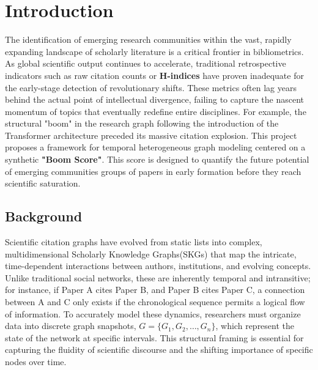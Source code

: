 \documentclass[a4paper,12pt]{article}
\begin{document}
\newpage

\setcounter{page}{1}

\section{Introduction}
The identification of emerging research communities within the vast, rapidly expanding 
landscape of scholarly literature is a critical frontier in bibliometrics. As global 
scientific output continues to accelerate, traditional retrospective indicators such 
as raw citation counts or \textbf{H-indices} have proven inadequate for the early-stage 
detection of revolutionary shifts. These metrics often lag years behind the actual 
point of intellectual divergence, failing to capture the nascent momentum of topics 
that eventually redefine entire disciplines. For example, the structural "boom" in the 
research graph following the introduction of the Transformer architecture preceded its 
massive citation explosion. This project proposes a framework for temporal heterogeneous 
graph modeling centered on a synthetic \textbf{"Boom Score"}. This score is designed to quantify 
the future potential of emerging communities groups of papers in early formation before 
they reach scientific saturation.
\subsection{Background}
Scientific citation graphs have evolved from static lists into complex, multidimensional 
Scholarly Knowledge Graphs(SKGs) that map the intricate, time-dependent interactions between 
authors, institutions, and evolving concepts. Unlike traditional social networks, these are 
inherently temporal and intransitive; for instance, if Paper A cites Paper B, and Paper B 
cites Paper C, a connection between A and C only exists if the chronological sequence 
permits a logical flow of information\parencite{holme_temporal_2012}. To accurately model 
these dynamics, researchers must organize data into discrete graph snapshots, 
$G = \{G_1, G_2, \dots, G_n\}$, which represent the state of the network at specific intervals. 
This structural framing is essential for capturing the fluidity of scientific discourse and 
the shifting importance of specific nodes over time.
\end{document}
